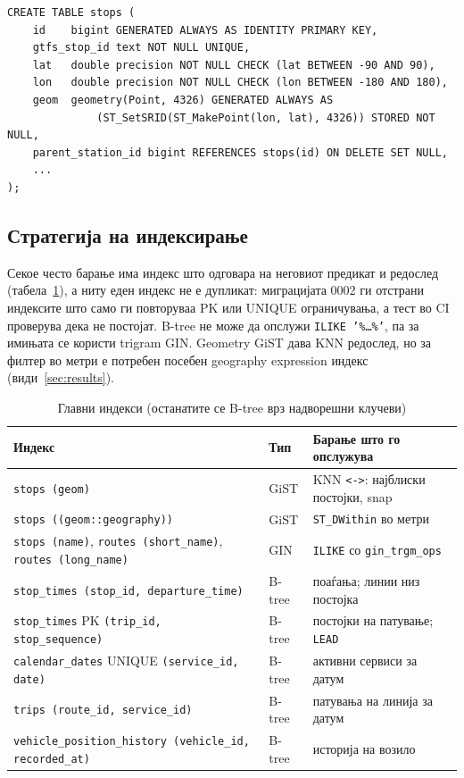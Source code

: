 \documentclass[11pt, a4paper]{article}
\let\oldunderscore\_
\renewcommand{\_}{\oldunderscore\allowbreak}
\newcommand{\code}[1]{\texttt{#1}}
\begin{document}
\begin{lstlisting}
CREATE TABLE stops (
    id    bigint GENERATED ALWAYS AS IDENTITY PRIMARY KEY,
    gtfs_stop_id text NOT NULL UNIQUE,
    lat   double precision NOT NULL CHECK (lat BETWEEN -90 AND 90),
    lon   double precision NOT NULL CHECK (lon BETWEEN -180 AND 180),
    geom  geometry(Point, 4326) GENERATED ALWAYS AS
              (ST_SetSRID(ST_MakePoint(lon, lat), 4326)) STORED NOT NULL,
    parent_station_id bigint REFERENCES stops(id) ON DELETE SET NULL,
    ...
);
\end{lstlisting}

\subsection{Стратегија на индексирање}

Секое често барање има индекс што одговара на неговиот предикат и редослед (табела~\ref{tab:idx}), а ниту еден индекс не е дупликат: миграцијата 0002 ги отстрани индексите што само ги повторуваа PK или UNIQUE ограничувања, а тест во CI проверува дека не постојат. B-tree не може да опслужи \code{ILIKE '\%\ldots\%'}, па за имињата се користи trigram GIN. Geometry GiST дава KNN редослед, но за филтер во метри е потребен посебен geography expression индекс (види~\ref{sec:results}).

\begin{table}[!htb]
\centering
\small
\let\_\oldunderscore
\begin{tabularx}{\textwidth}{@{}>{\raggedright\arraybackslash}p{7.6cm}lX@{}}
\toprule
\textbf{Индекс} & \textbf{Тип} & \textbf{Барање што го опслужува} \\
\midrule
\code{stops (geom)} & GiST & KNN \code{<->}: најблиски постојки, snap \\
\code{stops ((geom::geography))} & GiST & \code{ST\_DWithin} во метри \\
\code{stops (name)}, \code{routes (short\_name)}, \code{routes (long\_name)} & GIN & \code{ILIKE} со \code{gin\_trgm\_ops} \\
\code{stop\_times (stop\_id, departure\_time)} & B-tree & поаѓања; линии низ постојка \\
\code{stop\_times} PK \code{(trip\_id, stop\_sequence)} & B-tree & постојки на патување; \code{LEAD} \\
\code{calendar\_dates} UNIQUE \code{(service\_id, date)} & B-tree & активни сервиси за датум \\
\code{trips (route\_id, service\_id)} & B-tree & патувања на линија за датум \\
\code{vehicle\_position\_history (vehicle\_id, recorded\_at)} & B-tree & историја на возило \\
\bottomrule
\end{tabularx}
\caption{Главни индекси (останатите се B-tree врз надворешни клучеви)}
\label{tab:idx}
\end{table}
\end{document}
